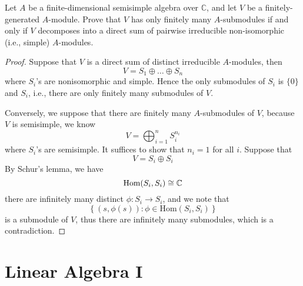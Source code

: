 \begin{prob}[F2011-Q5]
    Let \( A \) be a finite-dimensional semisimple algebra over \( \mathbb{C} \), and let \( V \) be a finitely-generated \( A \)-module. Prove that \( V \) has only finitely many \( A \)-submodules if and only if \( V \) decomposes into a direct sum of pairwise irreducible non-isomorphic (i.e., simple)  \( A \)-modules.
\end{prob}
\begin{proof}
    Suppose that $V$ is a direct sum of distinct irreducible $A$-modules, then 
    \begin{equation*}
        V=S_1\oplus\dots\oplus S_n
    \end{equation*}
    where $S_i$'s are nonisomorphic and simple. Hence the only submodules of $S_i$ is $\{0\}$ and $S_i$, i.e., there are only finitely many submodules of $V$.

    Conversely, we suppose that there are finitely many $A$-submodules of $V$, because $V$ is semisimple, we know 
    \begin{equation*}
        V=\bigoplus_{i=1}^n S_i^{n_i}
    \end{equation*} 
    where $S_i$'s are semisimple. It suffices to show that $n_i=1$ for all $i$. Suppose that 
    \begin{equation*}
        V=S_i\oplus S_i
    \end{equation*}
    By Schur's lemma, we have 
    \begin{equation*}
        \text{Hom}(S_i,S_i)\cong\mathbb{C}
    \end{equation*}
    there are infinitely many distinct $\phi:S_i\to S_i$, and we note that 
    \begin{equation*}
        \left\{(s,\phi(s)):\phi\in\text{Hom}(S_i,S_i)\right\}
    \end{equation*} 
    is a submodule of $V$, thus there are infinitely many submodules, which is a contradiction.
\end{proof}






















\chapter{Linear Algebra I}

